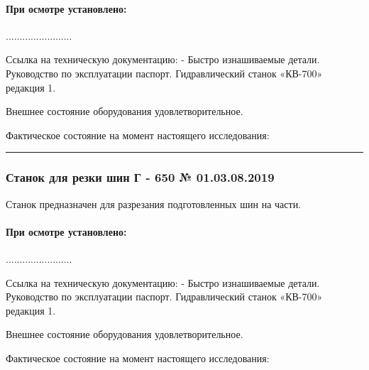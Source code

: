 \vspace{10mm}



\paragraph{При  осмотре установлено:}

........................



Ссылка на техническую документацию:
- Быстро изнашиваемые детали. Руководство по эксплуатации паспорт.
Гидравлический станок «КВ-700» редакция 1.

Внешнее состояние оборудования удовлетворительное.

Фактическое состояние на момент настоящего исследования:

\rule{145mm}{0.1 mm}

\subsubsection{Станок для резки шин Г - 650 № 01.03.08.2019}

Станок предназначен для разрезания подготовленных шин на
 части.

\vspace{10mm}




\paragraph{При  осмотре установлено:}

........................


Ссылка на техническую документацию:
- Быстро изнашиваемые детали. Руководство по эксплуатации паспорт.
Гидравлический станок «КВ-700» редакция 1.

Внешнее состояние оборудования удовлетворительное.

Фактическое состояние на момент настоящего исследования:


